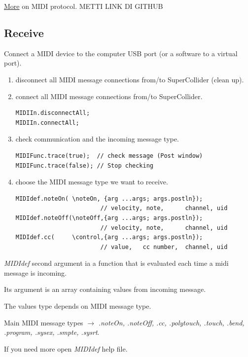 \href{img/MIDI_2.pdf}{More} on MIDI protocol. METTI LINK DI GITHUB

\subsection{Receive}\label{receive-midi}
Connect a MIDI device to the computer USB port (or a software to a virtual port).

\begin{enumerate}
\def\labelenumi{\arabic{enumi}.}
\tightlist
\item disconnect all MIDI message connections from/to SuperCollider (clean up).
\item connect all MIDI message connections from/to SuperCollider.
\begin{lstlisting}[frame=single] 
MIDIIn.disconnectAll; 
MIDIIn.connectAll;   
\end{lstlisting} 

\item check communication and the incoming message type.
\begin{lstlisting}[frame=single] 
MIDIFunc.trace(true);  // check message (Post window)
MIDIFunc.trace(false); // Stop checking
\end{lstlisting} 

\item choose the MIDI message type we want to receive.
\begin{lstlisting}[frame=single] 
MIDIdef.noteOn( \noteOn, {arg ...args; args.postln}); 
                        // velocity, note,      channel, uid
MIDIdef.noteOff(\noteOff,{arg ...args; args.postln}); 
                        // velocity, note,      channel, uid
MIDIdef.cc(     \control,{arg ...args; args.postln}); 
                        // value,   cc number,  channel, uid
\end{lstlisting} 
\end{enumerate}

\textit{MIDIdef} second argument ia a function that is evaluated each time a midi message is incoming.

Its argument is an array containing values from incoming message.

The values type depends on MIDI message type.

Main MIDI message types  \(\rightarrow\) \textit{.noteOn, .noteOff, .cc, .polytouch, .touch, .bend, .program, .sysex, .smpte, .sysrt}.

If you need more open \textit{MIDIdef} help file.

